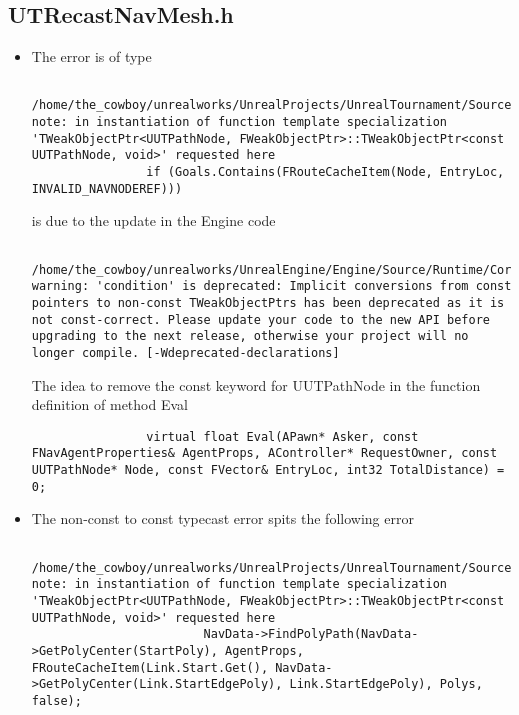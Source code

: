 \documentclass{article}
\begin{document}
     \subsection{UTRecastNavMesh.h}
     \begin{itemize}
     \item The error is of type
       \lstset{language=c++}
       \begin{lstlisting}
         /home/the_cowboy/unrealworks/UnrealProjects/UnrealTournament/Source/UnrealTournament/Public/UTRecastNavMesh.h:276:38: note: in instantiation of function template specialization 'TWeakObjectPtr<UUTPathNode, FWeakObjectPtr>::TWeakObjectPtr<const UUTPathNode, void>' requested here
                if (Goals.Contains(FRouteCacheItem(Node, EntryLoc, INVALID_NAVNODEREF)))
              \end{lstlisting}
              is due to the update in the Engine code
              \lstset{language=c++}
              \begin{lstlisting}
                /home/the_cowboy/unrealworks/UnrealEngine/Engine/Source/Runtime/Core/Public/UObject/WeakObjectPtrTemplates.h:77:3: warning: 'condition' is deprecated: Implicit conversions from const pointers to non-const TWeakObjectPtrs has been deprecated as it is not const-correct. Please update your code to the new API before upgrading to the next release, otherwise your project will no longer compile. [-Wdeprecated-declarations]
              \end{lstlisting}
              The idea to remove the const keyword for UUTPathNode in the function definition of method Eval
\lstset{language=c++}
              \begin{lstlisting}
                virtual float Eval(APawn* Asker, const FNavAgentProperties& AgentProps, AController* RequestOwner, const UUTPathNode* Node, const FVector& EntryLoc, int32 TotalDistance) = 0;
              \end{lstlisting}
            \item The non-const to const typecast error spits the following error
              \lstset{language=c++}
              \begin{lstlisting}
                /home/the_cowboy/unrealworks/UnrealProjects/UnrealTournament/Source/UnrealTournament/Private/UTBot.cpp:3964:89: note: in instantiation of function template specialization 'TWeakObjectPtr<UUTPathNode, FWeakObjectPtr>::TWeakObjectPtr<const UUTPathNode, void>' requested here
                        NavData->FindPolyPath(NavData->GetPolyCenter(StartPoly), AgentProps, FRouteCacheItem(Link.Start.Get(), NavData->GetPolyCenter(Link.StartEdgePoly), Link.StartEdgePoly), Polys, false);

\end{lstlisting}
\end{itemize}
\end{document}
